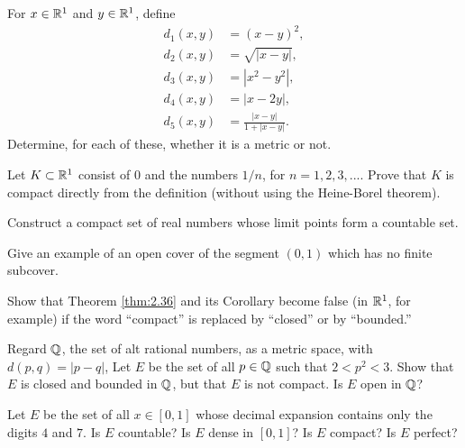\begin{myexercise}
    \label{ex:2.11}
    For $x \in {\protect\mathbb R}^1$ and $y \in {\protect\mathbb R}^1$, define
    \begin{align*}
        d_1(x,y) &= (x-y)^2, \\
        d_2(x,y) &= \sqrt{|x-y|}, \\
        d_3(x,y) &= |x^2-y^2|, \\
        d_4(x,y) &= |x-2y|, \\
        d_5(x,y) &= \frac{|x-y|}{1+|x-y|}.
    \end{align*}
    Determine, for each of these, 
    whether it is a metric or not.
\end{myexercise}

\begin{myexercise}
    \label{ex:2.12}
    Let $K \subset {\protect\mathbb R}^1$ consist of $0$ and the numbers $1/n$, 
    for $n = 1, 2, 3, ...$. 
    Prove that $K$ is compact directly from the definition 
    (without using the Heine-Borel theorem).
\end{myexercise}

\begin{myexercise}
    \label{ex:2.13}
    Construct a compact set of real numbers whose limit points form a countable set.
\end{myexercise}

\begin{myexercise}
    \label{ex:2.14}
    Give an example of an open cover of the segment $(0, 1)$ 
    which has no finite subcover.
\end{myexercise}

\begin{myexercise}
    \label{ex:2.15}
    Show that Theorem \ref{thm:2.36} and its Corollary become false 
    (in ${\protect\mathbb R}^1$, for example) 
    if the word ``compact'' is replaced by ``closed'' or by ``bounded.''
\end{myexercise}

\begin{myexercise}
    \label{ex:2.16}
    Regard ${\protect\mathbb Q}$, the set of alt rational numbers, as a metric space, 
    with $d(p, q) = |p - q|$,
    Let $E$ be the set of all $p \in {\protect\mathbb Q}$ such that $2 < p^2 < 3$. 
    Show that $E$ is closed and bounded in ${\protect\mathbb Q}$, 
    but that $E$ is not compact. 
    Is $E$ open in ${\protect\mathbb Q}$?
\end{myexercise}

\begin{myexercise}
    \label{ex:2.17}
    Let $E$ be the set of all $x \in [0, 1]$ 
    whose decimal expansion contains only the digits $4$ and $7$. 
    Is $E$ countable? 
    Is $E$ dense in $[0, 1]$? 
    Is $E$ compact? 
    Is $E$ perfect?
\end{myexercise}


